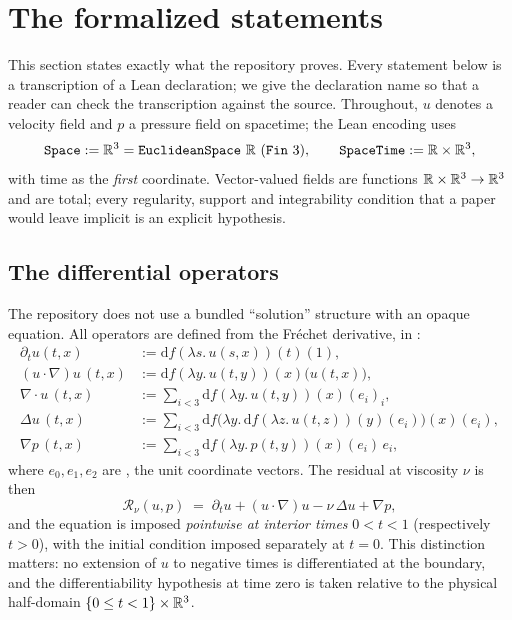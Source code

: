 \section{The formalized statements}
\label{sec:results}

This section states exactly what the repository proves. Every statement below is a
transcription of a Lean declaration; we give the declaration name so that a reader can
check the transcription against the source. Throughout, $u$ denotes a velocity field
and $p$ a pressure field on spacetime; the Lean encoding uses
\[
  \texttt{Space} := \R^3 = \texttt{EuclideanSpace}\ \R\ (\texttt{Fin}\ 3),
  \qquad
  \texttt{SpaceTime} := \R \times \R^3,
\]
with time as the \emph{first} coordinate. Vector-valued fields are functions
$\mathbb{R}\times\mathbb{R}^3 \to \mathbb{R}^3$ and are total; every regularity, support and integrability
condition that a paper would leave implicit is an explicit hypothesis.

\subsection{The differential operators}
\label{sec:operators}

The repository does not use a bundled ``solution'' structure with an opaque equation.
All operators are defined from the Fr\'echet derivative, in
:
\begin{align*}
  \partial_t u(t,x) &:= \mathrm{d}f(\lambda s.\, u(s,x))(t)(1), \\
  (u\cdot\nabla)u\,(t,x) &:= \mathrm{d}f(\lambda y.\, u(t,y))(x)\bigl(u(t,x)\bigr), \\
  \nabla\cdot u\,(t,x) &:= \textstyle\sum_{i<3} \mathrm{d}f(\lambda y.\,u(t,y))(x)(e_i)_i, \\
  \Delta u\,(t,x) &:= \textstyle\sum_{i<3} \mathrm{d}f\bigl(\lambda y.\, \mathrm{d}f(\lambda z.\,u(t,z))(y)(e_i)\bigr)(x)(e_i), \\
  \nabla p\,(t,x) &:= \textstyle\sum_{i<3} \mathrm{d}f(\lambda y.\,p(t,y))(x)(e_i)\, e_i,
\end{align*}
where $e_0,e_1,e_2$ are , the unit coordinate vectors. The
residual at viscosity $\nu$ is then
\begin{equation}
  \mathcal{R}_\nu(u,p) \;=\; \partial_t u + (u\cdot\nabla)u - \nu\,\Delta u + \nabla p,
  \label{eq:residual}
\end{equation}
and the equation is imposed \emph{pointwise at interior times} $0<t<1$ (respectively
$t>0$), with the initial condition imposed separately at $t=0$. This distinction
matters: no extension of $u$ to negative times is differentiated at the boundary, and
the differentiability hypothesis at time zero is taken relative to the physical
half-domain $\{0\le t<1\}\times\mathbb{R}^3$.

